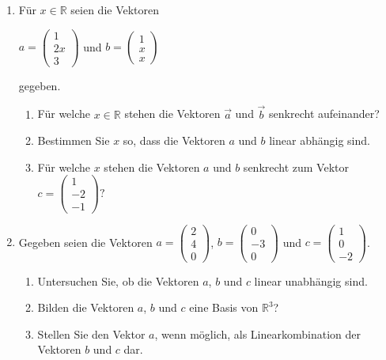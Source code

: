 \documentclass[12pt,a4paper]{scrreprt}
\newcommand{\R}{\mathds{R}}
\begin{document}
\begin{enumerate}
\begin{enumerate}
\end{enumerate}

\item Für $x \in \R$ seien die Vektoren

	$a=\begin{pmatrix}
		1 \\
		2x\\
		3
	\end{pmatrix}$ und
	$b=\begin{pmatrix}
		1 \\
		x\\
		x
	\end{pmatrix}$

	gegeben.
	\begin{enumerate}
		\item Für welche $x \in \R$ stehen die Vektoren $\vec{a}$ und $\vec{b}$ senkrecht aufeinander?
		\item Bestimmen Sie $x$ so, dass die Vektoren $a$ und $b$ linear abhängig sind.
		\item Für welche $x$ stehen die Vektoren $a$ und $b$ senkrecht zum Vektor \\
		$c=\begin{pmatrix}
			1 \\
			-2\\
			-1
		\end{pmatrix}?$
	\end{enumerate}

\item Gegeben seien die Vektoren
	$a=\begin{pmatrix}
		2 \\
		4 \\
		0
	\end{pmatrix}$,
	$b=\begin{pmatrix}
		0 \\
		-3\\
		0
	\end{pmatrix}$ und
	$c=\begin{pmatrix}
		1 \\
		0 \\
		-2
	\end{pmatrix}$.

	\begin{enumerate}
		\item Untersuchen Sie, ob die Vektoren $a$, $b$ und $c$ linear unabhängig sind.
		\item Bilden die Vektoren $a$, $b$ und $c$ eine Basis von $\R^3$?
		\item Stellen Sie den Vektor $a$, wenn möglich, als Linearkombination der Vektoren $b$ und $c$ dar.
	\end{enumerate}


\end{enumerate}
\end{document}
